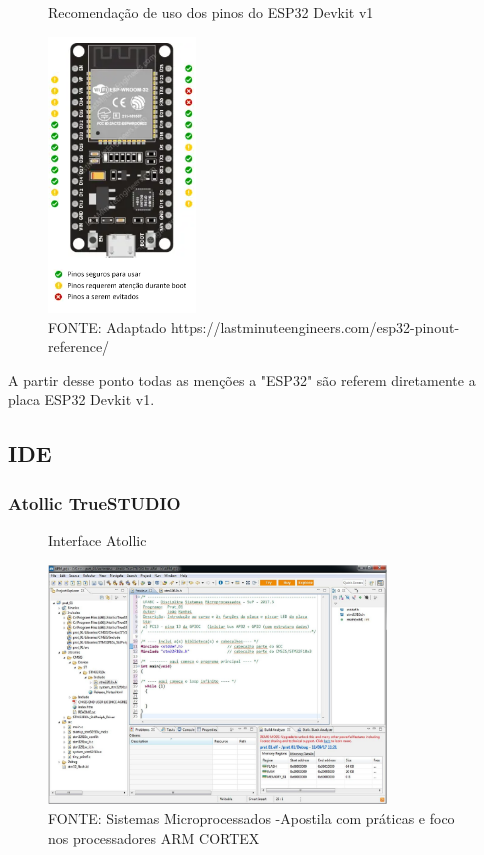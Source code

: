 \begin{figure}[ht]
	\centering
	\caption{Recomendação de uso dos pinos do ESP32 Devkit v1}
	\includegraphics[width=0.35\textwidth]{figures/esp32_pinout_ref}
	\caption*{FONTE: Adaptado https://lastminuteengineers.com/esp32-pinout-reference/}
	\label{esp32_pinout_ref}
\end{figure}

A partir desse ponto todas as menções a "ESP32" são referem diretamente a placa ESP32 Devkit v1.


\subsection{IDE}

\subsubsection{Atollic TrueSTUDIO}

\begin{figure}[ht]
	\centering
	\caption{Interface Atollic}
	\includegraphics[width=0.8\textwidth]{figures/atollic}
	\caption*{FONTE: Sistemas Microprocessados -Apostila com práticas e foco nos processadores ARM CORTEX \cite{apostila_microprossados}}
\end{figure}

